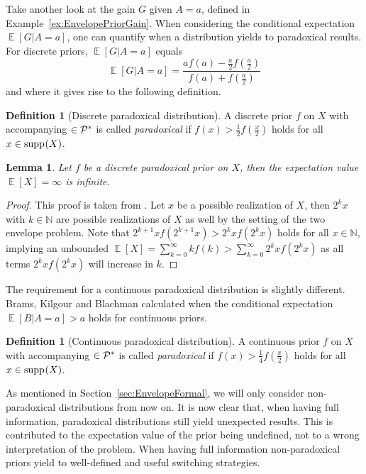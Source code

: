 \documentclass[a4paper]{report}
\theoremstyle{plain}
\newtheorem{lemma}[theorem]{Lemma}
\theoremstyle{definition}
\newtheorem{definition}[theorem]{Definition}
\theoremstyle{remark}
\numberwithin{equation}{chapter}
\newcommand{\N}{\mathbb{N}}
\let\P\relax
\DeclareMathOperator{\P}{\mathbb{P}}
\DeclareMathOperator{\E}{\mathbb{E}}
\DeclareMathOperator{\1}{\mathbbm{1}}
\DeclareMathOperator{\supp}{supp}
\newcommand{\Pmod}{\mathcal{P}^*}
\begin{document}
Take another look at the gain $G$ given $A=a$, defined in Example~\ref{ex:EnvelopePriorGain}. When considering the conditional expectation $\E[G|A=a]$, one can quantify when a distribution yields to paradoxical results. For discrete priors, $\E[G|A=a]$ equals \cite{Navara17,Tzur18}
\begin{equation}
\E[G|A=a]=\frac{af(a)-\frac{a}{2}f\left(\frac{a}{2}\right)}{f(a)+f\left(\frac{a}{2}\right)}
\end{equation}
and where it gives rise to the following definition.
\begin{definition}[Discrete paradoxical distribution]
A discrete prior $f$ on $X$ with accompanying $\P\in\Pmod$ is called \emph{paradoxical} if $f(x)>\frac{1}{2}f\left(\frac{x}{2}\right)$ holds for all $x\in\supp_{\P}(X)$.
\end{definition}
\begin{lemma}
Let $f$ be a discrete paradoxical prior on $X$, then the expectation value $\E[X]=\infty$ is infinite.
\end{lemma}
\begin{proof}
This proof is taken from \cite{Tzur18}. Let $x$ be a possible realization of $X$, then $2^k x$ with $k\in\N$ are possible realizations of $X$ as well by the setting of the two envelope problem. Note that $2^{k+1}xf(2^{k+1} x)>2^k xf(2^kx)$ holds for all $x\in\N$, implying an unbounded $\E[X]=\sum_{k=0}^\infty k f(k)>\sum_{k=0}^\infty 2^k xf(2^k x)$ as all terms $2^kxf(2^kx)$ will increase in $k$.
\end{proof}

The requirement for a continuous paradoxical distribution is slightly different. Brams, Kilgour and Blachman \cite{Brams95,Christensen96} calculated when the conditional expectation $\E[B|A=a]>a$ holds for continuous priors.

\begin{definition}[Continuous paradoxical distribution]
A continuous prior $f$ on $X$ with accompanying $\P\in\Pmod$ is called \emph{paradoxical} if $f(x)>\frac{1}{4}f\left(\frac{x}{2}\right)$ holds for all $x\in\supp_{\P}(X)$.
\end{definition}

As mentioned in Section~\ref{sec:EnvelopeFormal}, we will only consider non-paradoxical distributions from now on. It is now clear that, when having full information, paradoxical distributions still yield unexpected results. This is contributed to the expectation value of the prior being undefined, not to a wrong interpretation of the problem. When having full information non-paradoxical priors yield to well-defined and useful switching strategies.
\end{document}
